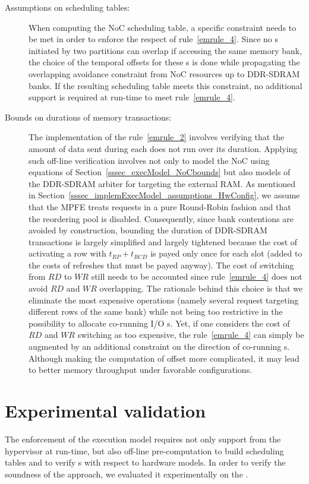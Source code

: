 \documentclass[main.tex]{subfiles}
\begin{document}
\begin{description}
    \item[Assumptions on scheduling tables: ] 
        When computing the NoC scheduling table, a specific constraint needs to be met in order to enforce the respect of rule~\ref{emrule_4}. Since no \PC{}s initiated by two partitions can overlap if accessing the same memory bank, the choice of the temporal offsets for these \PC{}s is done while propagating the overlapping avoidance constraint from NoC resources up to DDR-SDRAM banks. If the resulting scheduling table meets this constraint, no additional support is required at run-time to meet rule~\ref{emrule_4}.
    \item[Bounds on durations of memory transactions: ]
        The implementation of the rule~\ref{emrule_2} involves verifying that the amount of data sent during each \PC{} does not run over its duration. Applying such off-line verification involves not only to model the NoC using equations of Section~\ref{sssec_execModel_NoCbounds} but also models of the DDR-SDRAM arbiter for \PC{} targeting the external RAM. As mentioned in Section~\ref{sssec_implemExecModel_assumptions_HwConfig}, we assume that the MPFE treats requests in a pure Round-Robin fashion and that the reordering pool is disabled. Consequently, since bank contentions are avoided by construction, bounding the duration of DDR-SDRAM transactions is largely simplified and largely tightened because the cost of activating a row with $t_{RP} + t_{RCD}$ is payed only once for each \PC{} slot (added to the costs of refreshes that must be payed anyway). The cost of switching from $RD$ to $WR$ still needs to be accounted since rule~\ref{emrule_4} does not avoid $RD$ and $WR$ overlapping. The rationale behind this choice is that we eliminate the most expensive operations (namely several request targeting different rows of the same bank) while not being too restrictive in the possibility to allocate co-running I/O \PC{}s. Yet, if one considers the cost of $RD$ and $WR$ switching as too expensive, the rule~\ref{emrule_4} can simply be augmented by an additional constraint on the direction of co-running \PC{}s. Although making the computation of \PC{} offset more complicated, it may lead to better memory throughput under favorable configurations. 
\end{description}





\section{Experimental validation}
The enforcement of the execution model requires not only support from the hypervisor at run-time, but also off-line pre-computation to build scheduling tables and to verify \PC{}s with respect to hardware models. In order to verify the soundness of the approach, we evaluated it experimentally on the \mppalong.
\end{document}
